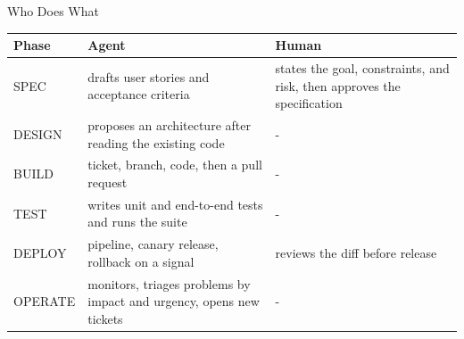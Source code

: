 \documentclass[aspectratio=169, table, 12pt]{beamer}
\begin{document}
\begin{frame}{{\Large Who Does What}}
  \vspace{4pt}
  \centering
  {\footnotesize
  \begin{tabularx}{\textwidth}{lYY}
    \hline
    \textbf{Phase} & \textbf{Agent} & \textbf{Human} \\
    \hline
    SPEC & drafts user stories and acceptance criteria & states the goal, constraints, and risk, then approves the specification \\
    \hline
    DESIGN & proposes an architecture after reading the existing code & - \\
    \hline
    BUILD & ticket, branch, code, then a pull request & - \\
    \hline
    TEST & writes unit and end-to-end tests and runs the suite & - \\
    \hline
    DEPLOY & pipeline, canary release, rollback on a signal & reviews the diff before release \\
    \hline
    OPERATE & monitors, triages problems by impact and urgency, opens new tickets & - \\
    \hline
  \end{tabularx}}
\end{frame}
\end{document}
